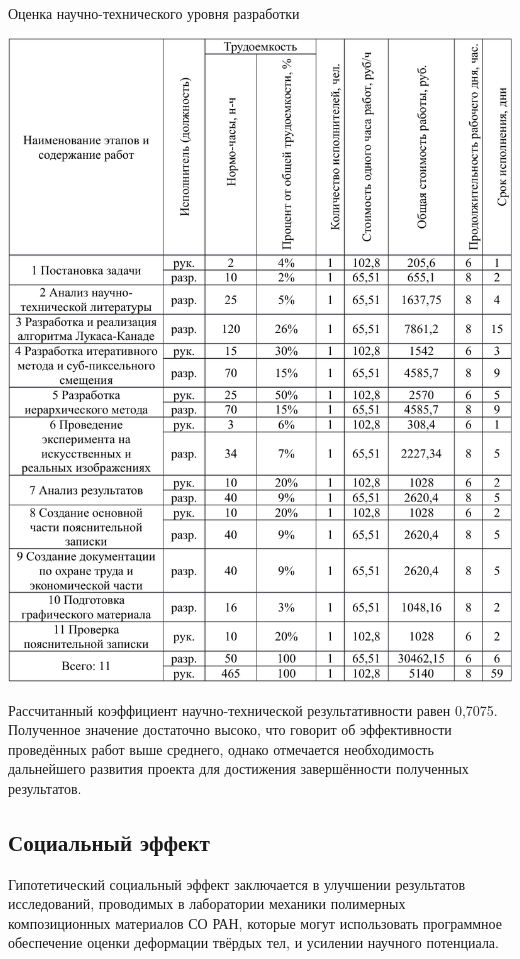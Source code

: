 \begin{table}[!ht]
\caption{Оценка научно-технического уровня разработки}
\centering
\includegraphics[page=10, width=1\linewidth]{econom_table.pdf}
\label{tab:eco_10}
\end{table}
Рассчитанный коэффициент научно-технической результативности равен 0,7075. Полученное значение достаточно высоко, что говорит об эффективности проведённых работ выше среднего, однако отмечается необходимость дальнейшего развития проекта для достижения завершённости полученных результатов.

\subsection{Социальный эффект}
Гипотетический социальный эффект заключается в улучшении результатов исследований, проводимых в лаборатории механики полимерных композиционных материалов СО РАН, которые могут использовать программное обеспечение оценки деформации твёрдых тел, и усилении научного потенциала.